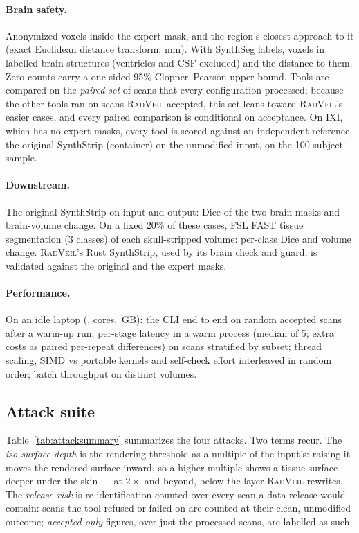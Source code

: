 \documentclass[11pt]{article}
\newcommand{\rv}{\textsc{RadVeil}}
\begin{document}
\paragraph{Brain safety.} Anonymized voxels inside the expert mask, and the
region's closest approach to it (exact Euclidean distance transform, mm).
With SynthSeg labels, voxels in labelled brain structures (ventricles and CSF
excluded) and the distance to them. Zero counts carry a one-sided 95\%
Clopper--Pearson upper bound. Tools are compared on the \emph{paired set} of
\bsPairedN{} scans that every configuration processed; because the other
tools ran on scans \rv{} accepted, this set leans toward \rv{}'s easier
cases, and every paired comparison is conditional on acceptance. On IXI,
which has no expert masks, every tool is scored against an independent
reference, the original SynthStrip (container) on the unmodified input, on
the 100-subject sample.
\paragraph{Downstream.} The original SynthStrip on input and output: Dice of
the two brain masks and brain-volume change. On a fixed 20\% of these cases,
FSL FAST tissue segmentation (3 classes) of each skull-stripped volume:
per-class Dice and volume change. \rv{}'s Rust SynthStrip, used by its
brain check and guard, is validated against the original and the expert
masks.
\paragraph{Performance.} On an idle laptop (\hwCpu, \hwCores{} cores,
\hwMem\,GB): the CLI end to end on \profCohortN{} random accepted scans after
a warm-up run; per-stage latency in a warm process (median of 5; extra costs
as paired per-repeat differences) on \profStageN{} scans stratified by
subset; thread scaling, SIMD vs portable kernels and self-check effort
interleaved in random order; batch throughput on
\profThroughputVolumes{} distinct volumes.

\subsection{Attack suite}
\label{sec:attacks}
Table~\ref{tab:attacksummary} summarizes the four attacks. Two terms recur.
The \emph{iso-surface depth} is the rendering threshold as a multiple of the
input's: raising it moves the rendered surface inward, so a higher multiple
shows a tissue surface deeper under the skin --- at $2\times$ and beyond,
below the layer \rv{} rewrites. The \emph{release risk} is re-identification
counted over every scan a data release would contain: scans the tool refused
or failed on are counted at their clean, unmodified outcome;
\emph{accepted-only} figures, over just the processed scans, are labelled as
such.
\end{document}
